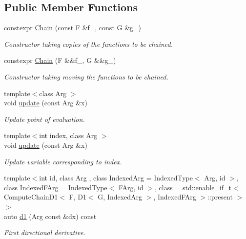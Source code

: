 \subsection*{Public Member Functions}
\begin{DoxyCompactItemize}
\item 
constexpr \hyperlink{structfuncy_1_1MathematicalOperations_1_1Chain_a239e2183912e8029d4cd521066cd1aac}{Chain} (const F \&f\-\_\-, const G \&g\-\_\-)
\begin{DoxyCompactList}\small\item\em Constructor taking copies of the functions to be chained. \end{DoxyCompactList}\item 
constexpr \hyperlink{structfuncy_1_1MathematicalOperations_1_1Chain_a77ff5f9f8d9f148f848aab5dd631eef6}{Chain} (F \&\&f\-\_\-, G \&\&g\-\_\-)
\begin{DoxyCompactList}\small\item\em Constructor taking moving the functions to be chained. \end{DoxyCompactList}\item 
{\footnotesize template$<$class Arg $>$ }\\void \hyperlink{structfuncy_1_1MathematicalOperations_1_1Chain_ab62968ffd731b7454def9a5b538259d9}{update} (const Arg \&x)
\begin{DoxyCompactList}\small\item\em Update point of evaluation. \end{DoxyCompactList}\item 
{\footnotesize template$<$int index, class Arg $>$ }\\void \hyperlink{structfuncy_1_1MathematicalOperations_1_1Chain_a262799d6eead518ecac8748a60f99696}{update} (const Arg \&x)
\begin{DoxyCompactList}\small\item\em Update variable corresponding to index. \end{DoxyCompactList}\item 
{\footnotesize template$<$int id, class Arg , class Indexed\-Arg  = Indexed\-Type$<$ Arg, id $>$, class Indexed\-F\-Arg  = Indexed\-Type$<$ F\-Arg, id $>$, class  = std\-::enable\-\_\-if\-\_\-t$<$                           Compute\-Chain\-D1$<$ F, D1$<$ G, Indexed\-Arg $>$, Indexed\-F\-Arg $>$\-::present $>$$>$ }\\auto \hyperlink{structfuncy_1_1MathematicalOperations_1_1Chain_aa4d5179b5d9776d7c10a9cef5aefe94d}{d1} (Arg const \&dx) const 
\begin{DoxyCompactList}\small\item\em First directional derivative. \end{DoxyCompactList}\item 

\end{DoxyCompactItemize}
